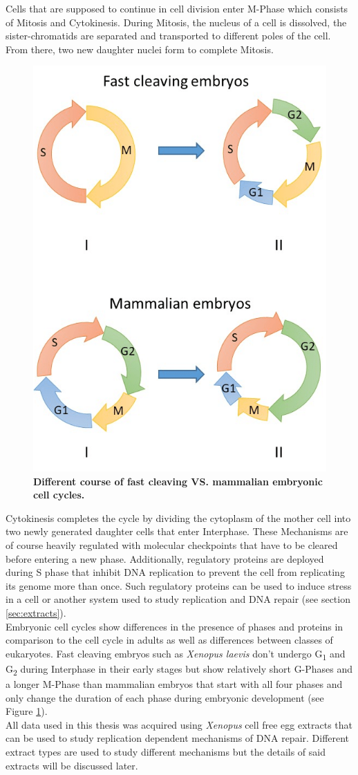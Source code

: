 Cells that are supposed to continue in cell division enter M-Phase which consists of Mitosis and Cytokinesis. During Mitosis, the nucleus of a cell is dissolved, the sister-chromatids are separated and transported to different poles of the cell. From there, two new daughter nuclei form to complete Mitosis. 
\begin{figure}
    \includegraphics[width=.38\textwidth]{resources/images/Intro/cycleXenHum.png}
    \caption[Different course of fast cleaving VS. mammalian embryonic cell cycles]{\textbf{Different course of fast cleaving VS. mammalian embryonic cell cycles.}\citep{Kermi.2019}}
    \label{fig:XenHumCyc}
\end{figure}
Cytokinesis completes the cycle by dividing the cytoplasm of the mother cell into two newly generated daughter cells that enter Interphase. These Mechanisms are of course heavily regulated with molecular checkpoints that have to be cleared before entering a new phase. Additionally, regulatory proteins are deployed during S phase that inhibit DNA replication to prevent the cell from replicating its genome more than once. Such regulatory proteins can be used to induce stress in a cell or another system used to study replication and DNA repair (see section \ref{sec:extracts}).\\
Embryonic cell cycles show differences in the presence of phases and proteins in comparison to the cell cycle in adults as well as differences between classes of eukaryotes. Fast cleaving embryos such as \textit{Xenopus laevis} don't undergo G\textsubscript{1} and G\textsubscript{2} during Interphase in their early stages but show relatively short G-Phases and a longer M-Phase than mammalian embryos that start with all four phases and only change the duration of each phase during embryonic development (see Figure \ref{fig:XenHumCyc}).\\
All data used in this thesis was acquired using \textit{Xenopus} cell free egg extracts that can be used to study replication dependent mechanisms of DNA repair. Different extract types are used to study different mechanisms but the details of said extracts will be discussed later.

